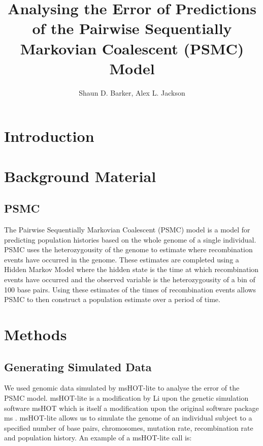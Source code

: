 \documentclass[]{article}
\title{Analysing the Error of Predictions of the Pairwise Sequentially Markovian Coalescent (PSMC) Model}
\author{Shaun D. Barker, Alex L. Jackson}
\begin{document}
\maketitle

\begin{abstract}

\end{abstract}
\section{Introduction}
\section{Background Material}
\subsection{PSMC}
The Pairwise Sequentially Markovian Coalescent (PSMC) model \cite{li2011inference} is a model for predicting population histories based on the whole genome of a single individual. PSMC uses the heterozygousity of the genome to estimate where recombination events have occurred in the genome. These estimates are completed using a Hidden Markov Model where the hidden state is the time at which recombination events have occurred and the observed variable is the heterozygousity of a bin of 100 base pairs. Using these estimates of the times of recombination events allows PSMC to then construct a population estimate over a period of time. 

\section{Methods}
\subsection{Generating Simulated Data} %
We used genomic data simulated by msHOT-lite \cite{mshotlite} to analyse the error of the PSMC model. msHOT-lite is a modification by Li upon the genetic simulation software msHOT \cite{hellenthal2007mshot} which is itself a modification upon the original software package ms \cite{hudson2002generating}. msHOT-lite allows us to simulate the genome of an individual subject to a specified number of base pairs, chromosomes, mutation rate, recombination rate and population history. 
An example of a msHOT-lite call is: 
\end{document}
